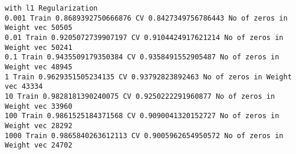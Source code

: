 \documentclass[11pt]{article}
\begin{document}
    \begin{Verbatim}[commandchars=\\\{\}]
with l1 Regularization
0.001 Train 0.8689392750666876 CV 0.8427349756786443 No of zeros in Weight vec 50505
0.01 Train 0.9205072739907197 CV 0.9104424917621214 No of zeros in Weight vec 50241
0.1 Train 0.9435509179350384 CV 0.9358491552905487 No of zeros in Weight vec 48945
1 Train 0.9629351505234135 CV 0.93792823892463 No of zeros in Weight vec 43334
10 Train 0.9828181390240075 CV 0.9250222291960877 No of zeros in Weight vec 33960
100 Train 0.9861525184371568 CV 0.9090041320152727 No of zeros in Weight vec 28292
1000 Train 0.9865840263612113 CV 0.9005962654950572 No of zeros in Weight vec 24702

    \end{Verbatim}
\end{document}
